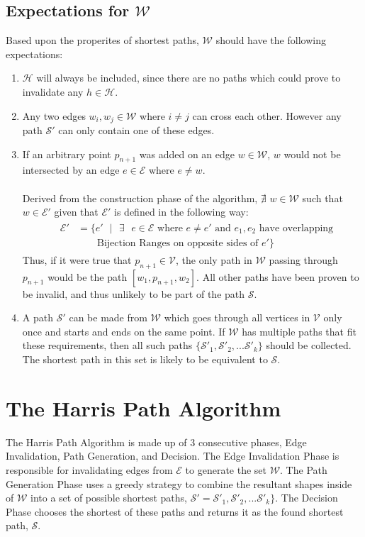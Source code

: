 \documentclass[12pt]{article}
\begin{document}
\subsection{Expectations for $\mathcal{W}$}\label{subsec:exp_w}
Based upon the properites of shortest paths, $\mathcal{W}$ should have the following expectations:
\begin{enumerate}
\item $\mathcal{H}$ will always be included, since there are no paths
which could prove to invalidate any $h \in \mathcal{H}$.
\item Any two edges $w_i,w_j \in \mathcal{W}$ where $i \neq j$ can cross each other.
However any path $\mathcal{S}'$ can only contain one of these edges.
\item If an arbitrary point $p_{n+1}$ was added on an edge $w \in \mathcal{W}$,
$w$ would not be intersected by an edge $e \in \mathcal{E}$ where $e \neq w$.
\\\\
Derived from the construction phase of the algorithm,
$\nexists$ $w \in \mathcal{W}$ such that $w \in \mathcal{E}'$
given that $\mathcal{E}'$ is defined in the following way:
\begin{align*}
&\begin{aligned}
\mathcal{E}' &= \{e'\text{ }|\text{ }\exists\text{ }e \in \mathcal{E} \text{ where } e \neq e'
\text{ and } e_1,e_2 \text{ have overlapping}\\
&\qquad \text{Bijection Ranges on opposite sides of } e'\}
\end{aligned}
\end{align*}
Thus, if it were true that $p_{n+1} \in \mathcal{V}$,
the only path in $\mathcal{W}$ passing
through $p_{n + 1}$ would be the path $[w_1,p_{n+1},w_2]$.
All other paths have been proven to be invalid,
and thus unlikely to be part of the path $\mathcal{S}$.
\item A path $\mathcal{S}'$ can be made from $\mathcal{W}$
which goes through all vertices in $\mathcal{V}$ only once
and starts and ends on the same point.
If $\mathcal{W}$ has multiple paths that fit these requirements, then all such paths
$\{\mathcal{S}'_1, \mathcal{S}'_2, ... \mathcal{S}'_k\}$ should be collected.
The shortest path in this set is likely to be equivalent to $\mathcal{S}$.
\end{enumerate}

\section{The Harris Path Algorithm}
The Harris Path Algorithm is made up of 3 consecutive phases,
Edge Invalidation, Path Generation, and Decision.
The Edge Invalidation Phase is
responsible for invalidating edges from $\mathcal{E}$ to generate the set
$\mathcal{W}$. The Path Generation Phase uses a greedy strategy to combine the resultant
shapes inside of $\mathcal{W}$ into a set of possible shortest paths,
$\mathcal{S}' = \mathcal{S}'_1, \mathcal{S}'_2, ... \mathcal{S}'_k\}$.
The Decision Phase chooses the shortest of these paths and returns it as the
found shortest path, $\mathcal{S}$.
\end{document}
